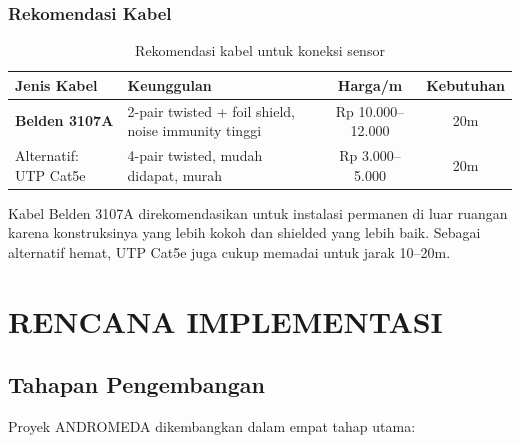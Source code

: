 \documentclass[12pt,a4paper,oneside]{report}
\begin{document}
\subsection{Rekomendasi Kabel}

\begin{table}[H]
\centering
\caption{Rekomendasi kabel untuk koneksi sensor}
\label{tab:cable-rec}
\begin{tabularx}{\textwidth}{l X c c}
\toprule
\textbf{Jenis Kabel} & \textbf{Keunggulan} & \textbf{Harga/m} & \textbf{Kebutuhan} \\
\midrule
\textbf{Belden 3107A} & 2-pair twisted + foil shield, noise immunity tinggi & Rp 10.000--12.000 & 20m \\
Alternatif: UTP Cat5e & 4-pair twisted, mudah didapat, murah & Rp 3.000--5.000 & 20m \\
\bottomrule
\end{tabularx}
\end{table}

Kabel Belden 3107A direkomendasikan untuk instalasi permanen di luar ruangan karena konstruksinya yang lebih kokoh dan shielded yang lebih baik. Sebagai alternatif hemat, UTP Cat5e juga cukup memadai untuk jarak 10--20m.


\chapter{RENCANA IMPLEMENTASI}

\section{Tahapan Pengembangan}

Proyek ANDROMEDA dikembangkan dalam empat tahap utama:
\end{document}
